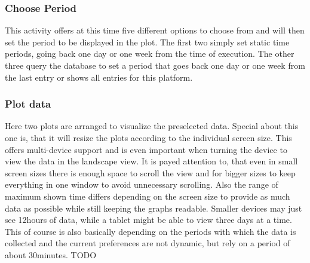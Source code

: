 \documentclass[11pt,oneside,a4paper]{scrartcl}
\begin{document}
\subsubsection{Choose Period}
This activity offers at this time five different options to choose from and will then set the period to be displayed in the plot. The first two simply set static time periods, going back one day or one week from the time of execution.
The other three query the database to set a period that goes back one day or one week from the last entry or shows all entries for this platform.

\subsubsection{Plot data}
Here two plots are arranged to visualize the preselected data. Special about this one is, that it will resize the plots according to the individual screen size. This offers multi-device support and is even important when turning the device to view the data in the landscape view. It is payed attention to, that even in small screen sizes there is enough space to scroll the view and for bigger sizes to keep everything in one window to avoid unnecessary scrolling. Also the range of maximum shown time differs depending on the screen size to provide as much data as possible while still keeping the graphs readable. Smaller devices may just see 12hours of data, while a tablet might be able to view three days at a time.
This of course is also basically depending on the periods with which the data is collected and the current preferences are not dynamic, but rely on a period of about 30minutes. TODO
\end{document}
